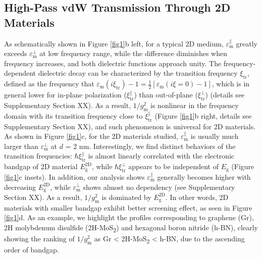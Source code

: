 \subsection{High-Pass vdW Transmission Through 2D Materials}
\label{sec:high-pass-vdw}

As schematically shown in Figure \ref{fig1}b left, for a typical 2D
medium, \(\varepsilon_{\mathrm{m}}^{\parallel}\) greatly exceeds
\(\varepsilon_{\mathrm{m}}^{\perp}\) at low frequency range, while the
difference diminishes when frequency increases, and both dielectric
functions approach unity. The frequency-dependent dielectric decay can
be characterized by the transition frequency \(\xi_{\mathrm{tr}}\),
defined as the frequency that \(\varepsilon_{\mathrm{m}}(i
\xi_{\mathrm{tr}}) - 1 =
\frac{1}{2}[\varepsilon_{\mathrm{m}}(i\xi=0) - 1]\), which is in
general lower for in-plane polarization
(\(\xi_{\mathrm{tr}}^{\parallel}\)) than out-of-plane
(\(\xi_{\mathrm{tr}}^{\perp}\)) (details see Supplementary Section XX).
 As a result, \(1/g_{\mathrm{m}}^{2}\) is nonlinear in the frequency
domain with its transition frequency close to
\(\xi_{\mathrm{tr}}^{\parallel}\) (Figure \ref{fig1}b right, details see
Supplementary Section XX), and such phenomenon is universal for 2D
materials. As shown in Figure \ref{fig1}c, for the 2D materials studied,
\(\varepsilon_{\mathrm{m}}^{\parallel}\) is usually much larger than
\(\varepsilon_{\mathrm{m}}^{\perp}\) at \(d\) = 2 nm.
Interestingly, we find distinct behaviors of the transition
frequencies: \(\hbar \xi_{\mathrm{tr}}^{\parallel}\) is almost linearly
correlated with the electronic bandgap of 2D material
\(E_{\mathrm{g}}^{\mathrm{2D}}\), while \(\hbar
\xi_{\mathrm{tr}}^{\perp}\) appears to be independent of
\(E_{\mathrm{g}}\) (Figure \ref{fig1}c insets). In addition, our analysis
shows \(\varepsilon_{\mathrm{m}}^{\parallel}\) generally becomes higher
with decreasing \(E_{\mathrm{g}}^{\mathrm{2D}}\), while
\(\varepsilon_{\mathrm{m}}^{\perp}\) shows almost no dependency (see
Supplementary Section XX).
As a result, \(1/g_{\mathrm{m}}^{2}\) is dominated by \(E_{\mathrm{g}}^{\mathrm{2D}}\). In other words, 2D materials with smaller bandgap exhibit better screening
effect, as seen in Figure \ref{fig1}d. As an example, we highlight the
profiles corresponding to graphene (Gr), 2H molybdenum disulfide
(2H-MoS\textsubscript{2}) and hexagonal boron nitride (h-BN), clearly showing the
ranking of \(1/g_{\mathrm{m}}^{2}\) as Gr \textless{} 2H-MoS\textsubscript{2} \textless{} h-BN, due to the ascending order of bandgap.




